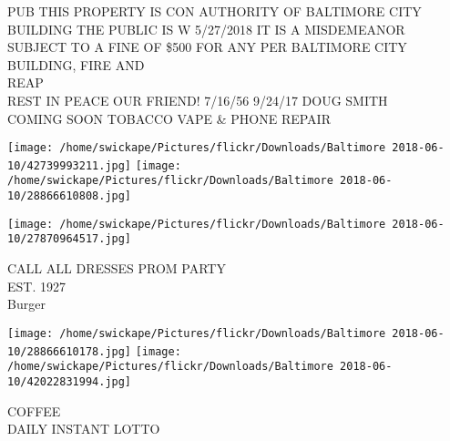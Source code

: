 \documentclass[10pt,letterpaper]{article}
\begin{document}
PUB THIS PROPERTY IS CON AUTHORITY OF BALTIMORE CITY BUILDING THE PUBLIC IS W 5/27/2018 IT IS A MISDEMEANOR SUBJECT TO A FINE OF \$500 FOR ANY PER BALTIMORE CITY BUILDING, FIRE AND\\
REAP\\
REST IN PEACE OUR FRIEND!  7/16/56 9/24/17 DOUG SMITH\\
COMING SOON TOBACCO VAPE \& PHONE REPAIR\\
\pagebreak

\texttt{[image: /home/swickape/Pictures/flickr/Downloads/Baltimore 2018-06-10/42739993211.jpg]}
\texttt{[image: /home/swickape/Pictures/flickr/Downloads/Baltimore 2018-06-10/28866610808.jpg]}

\vspace{0.25in}
\texttt{[image: /home/swickape/Pictures/flickr/Downloads/Baltimore 2018-06-10/27870964517.jpg]}

CALL ALL DRESSES PROM PARTY\\
EST. 1927\\
Burger\\
\pagebreak

\texttt{[image: /home/swickape/Pictures/flickr/Downloads/Baltimore 2018-06-10/28866610178.jpg]}
\texttt{[image: /home/swickape/Pictures/flickr/Downloads/Baltimore 2018-06-10/42022831994.jpg]}

COFFEE\\
DAILY INSTANT LOTTO\\
\pagebreak
\end{document}
